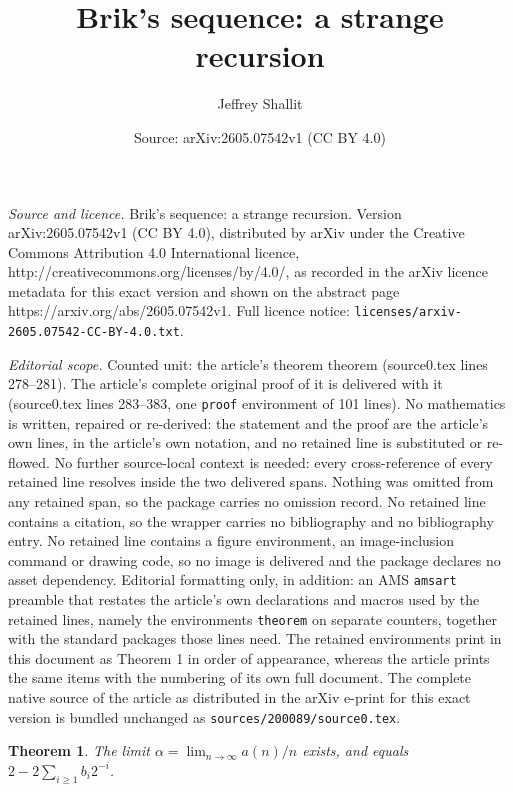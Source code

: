 \documentclass[10pt,a4paper]{amsart}
\title{Brik's sequence: a strange recursion}
\author{Jeffrey Shallit}
\date{Source: arXiv:2605.07542v1 (CC BY 4.0)}
\newtheorem{theorem}{Theorem}
\begin{document}
\maketitle

\noindent\emph{Source and licence.} Brik's sequence: a strange recursion. Version arXiv:2605.07542v1 (CC BY 4.0), distributed by arXiv under the Creative Commons Attribution 4.0 International licence, http://creativecommons.org/licenses/by/4.0/, as recorded in the arXiv licence metadata for this exact version and shown on the abstract page https://arxiv.org/abs/2605.07542v1. Full licence notice: \texttt{licenses/arxiv-2605.07542-CC-BY-4.0.txt}.\par\smallskip

\noindent\textit{Editorial scope.} Counted unit: the article's theorem theorem (source0.tex lines 278--281). The article's complete original proof of it is delivered with it (source0.tex lines 283--383, one \texttt{proof} environment of 101 lines). No mathematics is written, repaired or re-derived: the statement and the proof are the article's own lines, in the article's own notation, and no retained line is substituted or re-flowed.  No further source-local context is needed: every cross-reference of every retained line resolves inside the two delivered spans.  Nothing was omitted from any retained span, so the package carries no omission record.  No retained line contains a citation, so the wrapper carries no bibliography and no bibliography entry.  No retained line contains a figure environment, an image-inclusion command or drawing code, so no image is delivered and the package declares no asset dependency.  Editorial formatting only, in addition: an AMS \texttt{amsart} preamble that restates the article's own declarations and macros used by the retained lines, namely the environments \texttt{theorem} on separate counters, together with the standard packages those lines need.  The retained environments print in this document as Theorem 1 in order of appearance, whereas the article prints the same items with the numbering of its own full document.  The complete native source of the article as distributed in the arXiv e-print for this exact version is bundled unchanged as \texttt{sources/200089/source0.tex}.
\begin{theorem}
The limit $\alpha = \lim_{n \rightarrow \infty} a(n)/n$ exists, and
equals $2 - 2 \sum_{i \geq 1} b_i 2^{-i}$.
\end{theorem}
\end{document}
